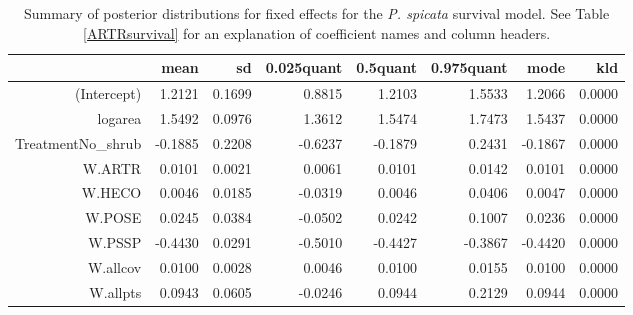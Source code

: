 \documentclass[11pt]{article}
\begin{document}
\begin{table}[ht]
\centering
\caption{Summary of posterior distributions for fixed effects for the \textit{P. spicata} survival model. See Table \ref{ARTRsurvival} for an explanation of coefficient names
and column headers.} 
\label{PSSPsurvival}
\begin{tabular}{rrrrrrrr}
  \hline
 & mean & sd & 0.025quant & 0.5quant & 0.975quant & mode & kld \\ 
  \hline
(Intercept) & 1.2121 & 0.1699 & 0.8815 & 1.2103 & 1.5533 & 1.2066 & 0.0000 \\ 
  logarea & 1.5492 & 0.0976 & 1.3612 & 1.5474 & 1.7473 & 1.5437 & 0.0000 \\ 
  TreatmentNo\_shrub & -0.1885 & 0.2208 & -0.6237 & -0.1879 & 0.2431 & -0.1867 & 0.0000 \\ 
  W.ARTR & 0.0101 & 0.0021 & 0.0061 & 0.0101 & 0.0142 & 0.0101 & 0.0000 \\ 
  W.HECO & 0.0046 & 0.0185 & -0.0319 & 0.0046 & 0.0406 & 0.0047 & 0.0000 \\ 
  W.POSE & 0.0245 & 0.0384 & -0.0502 & 0.0242 & 0.1007 & 0.0236 & 0.0000 \\ 
  W.PSSP & -0.4430 & 0.0291 & -0.5010 & -0.4427 & -0.3867 & -0.4420 & 0.0000 \\ 
  W.allcov & 0.0100 & 0.0028 & 0.0046 & 0.0100 & 0.0155 & 0.0100 & 0.0000 \\ 
  W.allpts & 0.0943 & 0.0605 & -0.0246 & 0.0944 & 0.2129 & 0.0944 & 0.0000 \\ 
   \hline
\end{tabular}
\end{table}
\end{document}
